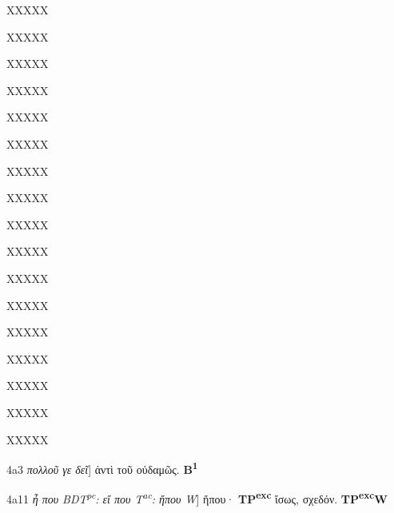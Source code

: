 \documentclass[11pt,a4paper]{book}
\begin{document}
\beginnumbering
\numberpstarttrue
\pstart XXXXX \pend

\pstart XXXXX \pend

\pstart XXXXX \pend

\pstart XXXXX \pend

\pstart XXXXX \pend

\pstart XXXXX \pend

\pstart XXXXX \pend

\pstart XXXXX \pend

\pstart XXXXX \pend

\pstart XXXXX \pend

\pstart XXXXX \pend

\pstart XXXXX \pend

\pstart XXXXX \pend

\pstart XXXXX \pend

\pstart XXXXX \pend

\pstart XXXXX \pend

\pstart XXXXX \pend

\pstart{}%
4a3 \textit{πολλοῦ γε δεῖ}] %
ἀντὶ τοῦ οὐδαμῶς. \textbf{B\textsuperscript{1}}
\pend

\pstart{}%
4a11 \textit{ἦ που BDT\textsuperscript{pc}: εἴ που
  T\textsuperscript{ac}: ἤπου W}] %
ἤπου· \textbf{TP\textsuperscript{exc}} ἴσως, σχεδόν. \textbf{TP\textsuperscript{exc}W}
\pend
\endnumbering
\end{document}
